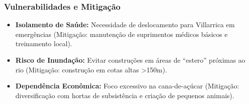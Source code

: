 \subsubsection{Vulnerabilidades e
Mitigação}

\begin{itemize}
\tightlist
\item
  \textbf{Isolamento de Saúde:} Necessidade de deslocamento para
  Villarrica em emergências (Mitigação: manutenção de suprimentos
  médicos básicos e treinamento local).
\item
  \textbf{Risco de Inundação:} Evitar construções em áreas de ``estero''
  próximas ao rio (Mitigação: construção em cotas altas
  \textgreater150m).
\item
  \textbf{Dependência Econômica:} Foco excessivo na cana-de-açúcar
  (Mitigação: diversificação com hortas de subsistência e criação de
  pequenos animais).
\end{itemize}

